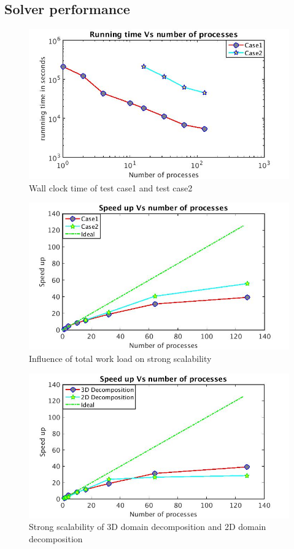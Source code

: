 \documentclass[conference,compsoc]{IEEEtran}
\begin{document}
\subsection{Solver performance}
\begin{figure}[!t]
\centering
\includegraphics[scale=0.33]{2cases_time}
\caption{Wall clock time of test case1 and test case2}
\label{fig:2cases_time}
\end{figure}
%
\begin{figure}[!t]
\centering
\includegraphics[scale=0.33]{2cases_efficiency}
\caption{Influence of total work load on strong scalability}
\label{fig:2cases_efficiency}
\end{figure}
%
\begin{figure}[!t]
\centering
\includegraphics[scale=0.33]{2D_vs_3D_efficiency}
\caption{Strong scalability of 3D domain decomposition and 2D domain decomposition}
\label{fig:2D_vs_3D_efficiency}
\end{figure}
\end{document}
